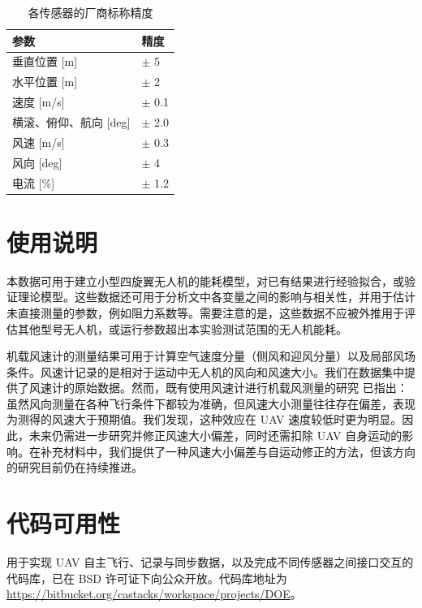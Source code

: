 \documentclass[fleqn,10pt]{wlscirep}
\begin{document}
\begin{longtable}{ll}
\caption{各传感器的厂商标称精度}
\label{tab:tolerances}\\
\textbf{参数}             & \textbf{精度} \\ \hline
\endfirsthead
%
\endhead
%
\hline
\endfoot
%
\endlastfoot
%
垂直位置 {[}m{]}      & $\pm$ 5           \\
水平位置 {[}m{]}    & $\pm$ 2           \\
速度 {[}m/s{]}             & $\pm$ 0.1         \\
横滚、俯仰、航向 {[}deg{]} & $\pm$ 2.0         \\
风速 {[}m/s{]}           & $\pm$ 0.3         \\
风向 {[}deg{]}       & $\pm$ 4           \\
电流 {[}\%{]}               & $\pm$ 1.2       \\ \hline
\end{longtable}

\section*{使用说明}
本数据可用于建立小型四旋翼无人机的能耗模型，对已有结果进行经验拟合，或验证理论模型。这些数据还可用于分析文中各变量之间的影响与相关性，并用于估计未直接测量的参数，例如阻力系数等。需要注意的是，这些数据不应被外推用于评估其他型号无人机，或运行参数超出本实验测试范围的无人机能耗。

机载风速计的测量结果可用于计算空气速度分量（侧风和迎风分量）以及局部风场条件。风速计记录的是相对于运动中无人机的风向和风速大小。我们在数据集中提供了风速计的原始数据。然而，既有使用风速计进行机载风测量的研究 \cite{garibaldi2010uav,bruschi2016wind,thorpe2018measurement} 已指出：虽然风向测量在各种飞行条件下都较为准确，但风速大小测量往往存在偏差，表现为测得的风速大于预期值。我们发现，这种效应在 UAV 速度较低时更为明显。因此，未来仍需进一步研究并修正风速大小偏差，同时还需扣除 UAV 自身运动的影响。在补充材料中，我们提供了一种风速大小偏差与自运动修正的方法，但该方向的研究目前仍在持续推进。 

\section*{代码可用性}
用于实现 UAV 自主飞行、记录与同步数据，以及完成不同传感器之间接口交互的代码库，已在 BSD 许可证下向公众开放。代码库地址为 \href{https://bitbucket.org/castacks/workspace/projects/DOE}{https://bitbucket.org/castacks/workspace/projects/DOE}。 
\end{document}
